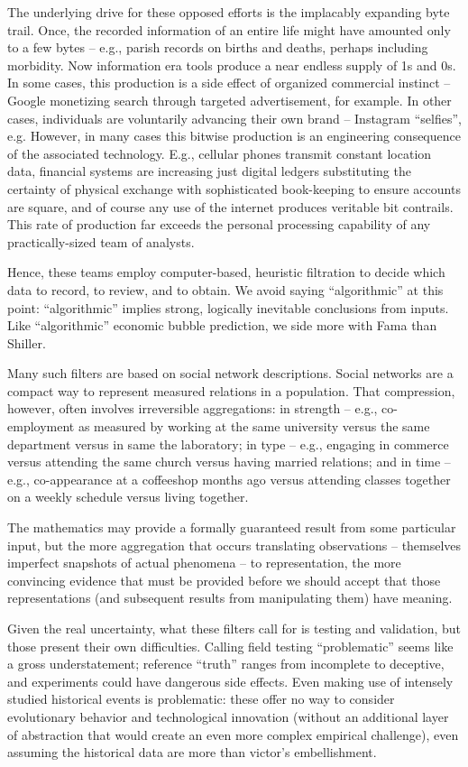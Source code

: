 \documentclass{article}
\begin{document}
The underlying drive for these opposed efforts is the implacably expanding byte trail.  Once, the recorded information of an entire life might have amounted only to a few bytes -- e.g., parish records on births and deaths, perhaps including morbidity.  Now information era tools produce a near endless supply of 1s and 0s.  In some cases, this production is a side effect of organized commercial instinct -- Google monetizing search through targeted advertisement, for example.  In other cases, individuals are voluntarily advancing their own brand -- Instagram ``selfies'', e.g.  However, in many cases this bitwise production is an engineering consequence of the associated technology.  E.g., cellular phones transmit constant location data, financial systems are increasing just digital ledgers substituting the certainty of physical exchange with sophisticated book-keeping to ensure accounts are square, and of course any use of the internet produces veritable bit contrails.  This rate of production far exceeds the personal processing capability of any practically-sized team of analysts.

Hence, these teams employ computer-based, heuristic filtration to decide which data to record, to review, and to obtain.  We avoid saying ``algorithmic'' at this point: ``algorithmic'' implies strong, logically inevitable conclusions from inputs.  Like ``algorithmic'' economic bubble prediction, we side more with Fama than Shiller.

Many such filters are based on social network descriptions.  Social networks are a compact way to represent measured relations in a population.  That compression, however, often involves irreversible aggregations: in strength -- e.g., co-employment as measured by working at the same university versus the same department versus in same the laboratory; in type -- e.g., engaging in commerce versus attending the same church versus having married relations; and in time -- e.g., co-appearance at a coffeeshop months ago versus attending classes together on a weekly schedule versus living together.

The mathematics may provide a formally guaranteed result from some particular input, but the more aggregation that occurs translating observations -- themselves imperfect snapshots of actual phenomena -- to representation, the more convincing evidence that must be provided before we should accept that those representations (and subsequent results from manipulating them) have meaning.

Given the real uncertainty, what these filters call for is testing and validation, but those present their own difficulties.  Calling field testing ``problematic'' seems like a gross understatement; reference ``truth'' ranges from incomplete to deceptive, and experiments could have dangerous side effects.  Even making use of intensely studied historical events is problematic: these offer no way to consider evolutionary behavior and technological innovation (without an additional layer of abstraction that would create an even more complex empirical challenge), even assuming the historical data are more than victor's embellishment.
\end{document}
